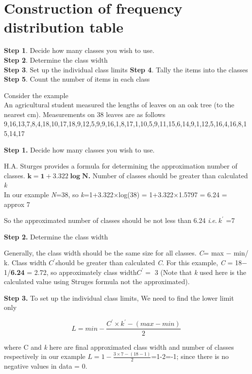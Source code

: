 \documentclass[
]{book}
\begin{document}
\hypertarget{construction-of-frequency-distribution-table}{%
\section{Construction of frequency distribution table}\label{construction-of-frequency-distribution-table}}

\textbf{Step 1}. Decide how many classes you wish to use.\\
\textbf{Step 2}. Determine the class width\\
\textbf{Step 3}. Set up the individual class limits
\textbf{Step 4}. Tally the items into the classes\\
\textbf{Step 5}. Count the number of items in each class

Consider the example\\
An agricultural student measured the lengths of leaves on an oak tree (to the nearest cm). Measurements on 38 leaves are as follows\\
9,16,13,7,8,4,18,10,17,18,9,12,5,9,9,16,1,8,17,1,10,5,9,11,15,6,14,9,1,12,5,16,4,16,8,15,14,17

\textbf{Step 1.} Decide how many classes you wish to use.

H.A. Sturges provides a formula for determining the approximation number of classes. \(\mathbf{k = 1 + 3.322}\mathbf{\log}\mathbf{N}\)\textbf{.} Number of classes should be greater than calculated \emph{k}\\
In our example \emph{N}=38, so \emph{k}=1+3.322×log(38) = 1+3.322×1.5797 = 6.24 = approx 7

So the approximated number of classes should be not less than 6.24 \emph{i}.\emph{e}.\(\ k^{'}\) =7

\textbf{Step 2.} Determine the class width

Generally, the class width should be the same size for all classes. \emph{C}= \textbar{} max − min\textbar/ k. Class width \(C^{'}\)should be greater than calculated \emph{C}. For this example, \emph{C} = \textbar{} 18− 1\textbar/\textbf{6.24} = 2.72, so approximately class width\(C^{'} =\) 3 (Note that \emph{k} used here is the calculated value using Struges formula not the approximated).

\textbf{Step 3.} To set up the individual class limits, We need to find the lower limit only

\[L = min - \frac{C^{'} \times k^{'} - (max - min)}{2}\]

where C and \emph{k} here are final approximated class width and number of classes respectively in our example \(L = 1 - \frac{3 \times 7 - (18 - 1)}{2}\)=1-2=-1; since there is no negative values in data = 0.
\end{document}
